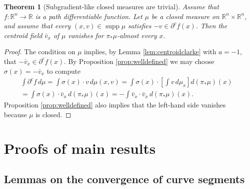 \documentclass[11pt]{article}
\newtheorem{thm}{Theorem}
\theoremstyle{definition}
\theoremstyle{remark}
\DeclareMathOperator{\supp}{supp}
\newcommand{\R}{\mathbb{R}}
\begin{document}
\begin{thm}[Subgradient-like closed measures are trivial]\label{thm:vxvanishes}
 Assume that $f\colon\R^n\to\R$ is a path differentiable function.
 Let $\mu$ be a closed measure on $\R^n\times\R^n$, and assume that every $(x,v)\in\supp\mu$ satisfies $-v\in\partial^cf(x)$. Then the centroid field $\bar v_x$ of $\mu$ vanishes for $\pi_*\mu$-almost every $x$.
\end{thm}
\begin{proof}
 The condition on $\mu$ implies, by Lemma \ref{lem:centroidclarke} with $a=-1$, that $-\bar v_x\in\partial^cf(x)$.
 By Proposition \ref{prop:welldefined} we may choose $\sigma(x)=-\bar v_x$ to compute
 \begin{multline*}
  \int\partial^cf\,d\mu=\int \sigma(x)\cdot v\,d\mu(x,v)=\int \sigma(x)\cdot\left[\int v\,d\mu_x\right]d(\pi_*\mu)(x) \\
  =\int \sigma(x)\cdot \bar v_x\,d(\pi_*\mu)(x)=-\int \bar v_x\cdot \bar v_x\,d(\pi_*\mu)(x).
 \end{multline*}
 Proposition \ref{prop:welldefined} also implies that the left-hand side vanishes because $\mu$ is closed.
\end{proof}

\section{Proofs of main results}
\label{sec:proofs}


\subsection{Lemmas on the convergence of curve segments}
\label{sec:pflemmasegments}
\end{document}
